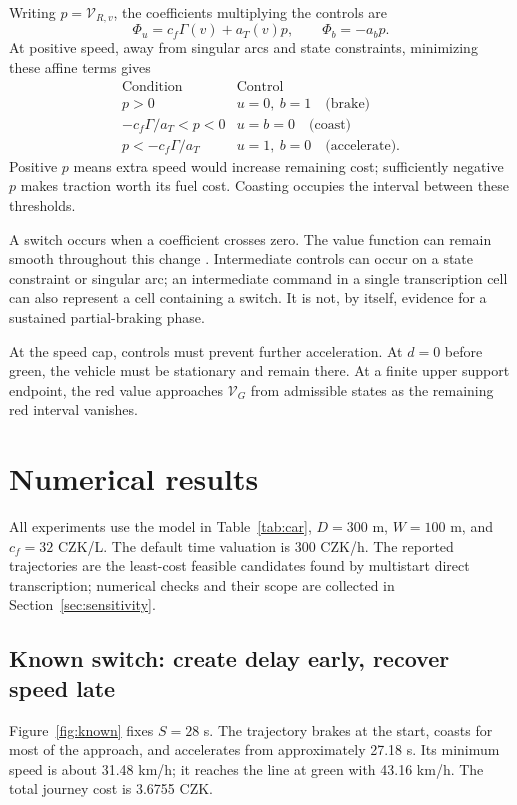 \documentclass[journal,a4paper,twocolumn]{IEEEtran}
\begin{document}
Writing $p=\mathcal V_{R,v}$, the coefficients multiplying the controls are
\begin{equation}
 \Phi_u=c_f\Gamma(v)+a_T(v)p,\qquad
 \Phi_b=-a_bp.
 \label{eq:switch}
\end{equation}
At positive speed, away from singular arcs and state constraints, minimizing these affine terms gives
\begin{equation}
\begin{array}{c|c}
\text{Condition}&\text{Control}\\ \hline
p>0&u=0,\ b=1\quad\text{(brake)}\\
-c_f\Gamma/a_T<p<0&u=b=0\quad\text{(coast)}\\
p<-c_f\Gamma/a_T&u=1,\ b=0\quad\text{(accelerate)}.
\end{array}
\label{eq:modes}
\end{equation}
Positive $p$ means extra speed would increase remaining cost; sufficiently negative $p$ makes traction worth its fuel cost. Coasting occupies the interval between these thresholds.

A switch occurs when a coefficient crosses zero. The value function can remain smooth throughout this change \cite{liberzon}. Intermediate controls can occur on a state constraint or singular arc; an intermediate command in a single transcription cell can also represent a cell containing a switch. It is not, by itself, evidence for a sustained partial-braking phase.

At the speed cap, controls must prevent further acceleration. At $d=0$ before green, the vehicle must be stationary and remain there. At a finite upper support endpoint, the red value approaches $\mathcal V_G$ from admissible states as the remaining red interval vanishes.

\section{Numerical results}\label{sec:numerics}
All experiments use the model in Table~\ref{tab:car}, $D=300$ m, $W=100$ m, and $c_f=32$ CZK/L. The default time valuation is 300 CZK/h. The reported trajectories are the least-cost feasible candidates found by multistart direct transcription; numerical checks and their scope are collected in Section~\ref{sec:sensitivity}.

\subsection{Known switch: create delay early, recover speed late}
Figure~\ref{fig:known} fixes $S=28$ s. The trajectory brakes at the start, coasts for most of the approach, and accelerates from approximately 27.18 s. Its minimum speed is about 31.48 km/h; it reaches the line at green with 43.16 km/h. The total journey cost is 3.6755 CZK.
\end{document}
